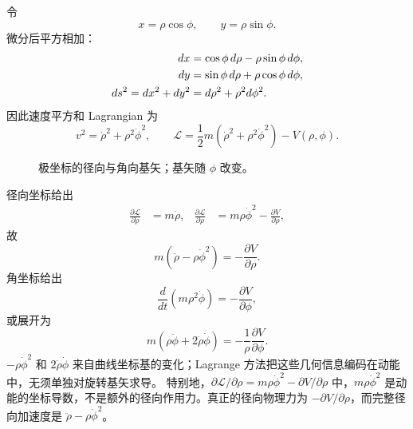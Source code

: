 \begin{checkedsolution}
令
\[
  x=\rho\cos\phi,
  \qquad
  y=\rho\sin\phi.
\]
微分后平方相加：
\begin{align}
  dx&=\cos\phi\,d\rho-\rho\sin\phi\,d\phi,\notag\\
  dy&=\sin\phi\,d\rho+\rho\cos\phi\,d\phi,\notag\\
  ds^2=dx^2+dy^2&=d\rho^2+\rho^2d\phi^2.
  \label{eq:QM-C02-S01-polar-line-element}
\end{align}
因此速度平方和 Lagrangian 为
\begin{equation}
  v^2=\dot\rho^2+\rho^2\dot\phi^2,
  \qquad
  \mathcal L
  =\frac12m(\dot\rho^2+\rho^2\dot\phi^2)-V(\rho,\phi).
  \label{eq:QM-C02-S01-polar-lagrangian}
\end{equation}

\begin{figure}[htbp]
  \centering
  \caption{极坐标的径向与角向基矢；基矢随 $\phi$ 改变。}
  \label{fig:QM-C02-S01-polar-basis}
\end{figure}

径向坐标给出
\begin{align}
  \frac{\partial\mathcal L}{\partial\dot\rho}&=m\dot\rho,
  &
  \frac{\partial\mathcal L}{\partial\rho}
  &=m\rho\dot\phi^2-\frac{\partial V}{\partial\rho},
\end{align}
故
\begin{equation}
  \boxed{
  m(\ddot\rho-\rho\dot\phi^2)
  =-\frac{\partial V}{\partial\rho}.}
  \label{eq:QM-C02-S01-polar-radial}
\end{equation}
角坐标给出
\begin{equation}
  \boxed{
  \frac{d}{dt}(m\rho^2\dot\phi)
  =-\frac{\partial V}{\partial\phi},}
  \label{eq:QM-C02-S01-polar-angular-conservative}
\end{equation}
或展开为
\begin{equation}
  \boxed{
  m(\rho\ddot\phi+2\dot\rho\dot\phi)
  =-\frac1\rho\frac{\partial V}{\partial\phi}.}
  \label{eq:QM-C02-S01-polar-angular}
\end{equation}
$-\rho\dot\phi^2$ 和 $2\dot\rho\dot\phi$ 来自曲线坐标基的变化；Lagrange 方法把这些几何信息编码在动能中，无须单独对旋转基矢求导。
特别地，$\partial\mathcal L/\partial\rho=m\rho\dot\phi^2-\partial V/\partial\rho$ 中，$m\rho\dot\phi^2$ 是动能的坐标导数，不是额外的径向作用力。真正的径向物理力为 $-\partial V/\partial\rho$，而完整径向加速度是 $\ddot\rho-\rho\dot\phi^2$。


\end{checkedsolution}
